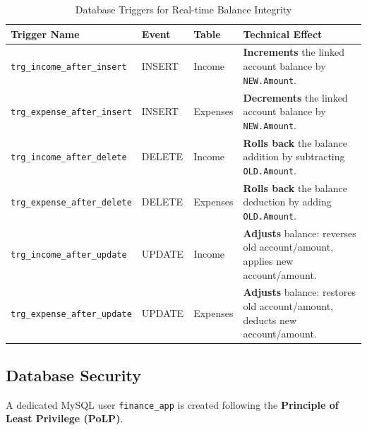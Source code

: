 \documentclass[12pt, a4paper]{article}
\begin{document}
\begin{table}[H]
\centering
\caption{Database Triggers for Real-time Balance Integrity}
\label{tab:triggers_full}
\begin{tabularx}{\textwidth}{>{\raggedright\arraybackslash}p{5.2cm} l l X}
\toprule
\textbf{Trigger Name} & \textbf{Event} & \textbf{Table} & \textbf{Technical Effect} \\
\midrule
\texttt{trg\_income\_after\_insert}  & INSERT & Income
  & \textbf{Increments} the linked account balance by \texttt{NEW.Amount}. \\
\addlinespace
\texttt{trg\_expense\_after\_insert} & INSERT & Expenses
  & \textbf{Decrements} the linked account balance by \texttt{NEW.Amount}. \\
\addlinespace
\texttt{trg\_income\_after\_delete}  & DELETE & Income
  & \textbf{Rolls back} the balance addition by subtracting \texttt{OLD.Amount}. \\
\addlinespace
\texttt{trg\_expense\_after\_delete} & DELETE & Expenses
  & \textbf{Rolls back} the balance deduction by adding \texttt{OLD.Amount}. \\
\addlinespace
\texttt{trg\_income\_after\_update}  & UPDATE & Income
  & \textbf{Adjusts} balance: reverses old account/amount, applies new account/amount. \\
\addlinespace
\texttt{trg\_expense\_after\_update} & UPDATE & Expenses
  & \textbf{Adjusts} balance: restores old account/amount, deducts new account/amount. \\
\bottomrule
\end{tabularx}
\end{table}

\subsection{Database Security}

A dedicated MySQL user \texttt{finance\_app} is created following the
\textbf{Principle of Least Privilege (PoLP)}.
\end{document}
